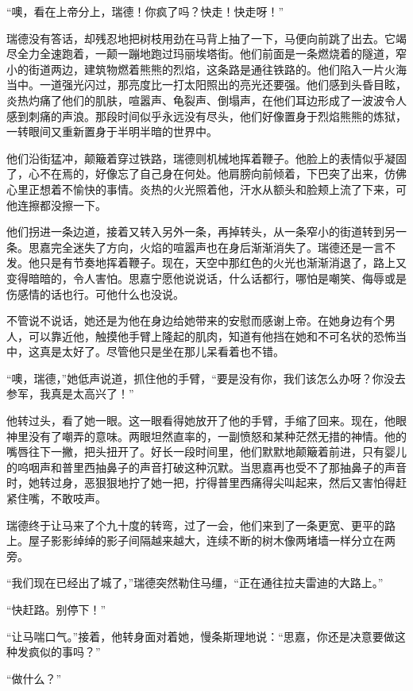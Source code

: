 \par “噢，看在上帝分上，瑞德！你疯了吗？快走！快走呀！”
\par 瑞德没有答话，却残忍地把树枝用劲在马背上抽了一下，马便向前跳了出去。它竭尽全力全速跑着，一颠一蹦地跑过玛丽埃塔街。他们前面是一条燃烧着的隧道，窄小的街道两边，建筑物燃着熊熊的烈焰，这条路是通往铁路的。他们陷入一片火海当中。一道强光闪过，那亮度比一打太阳照出的亮光还要强。他们感到头昏目眩，炎热灼痛了他们的肌肤，喧嚣声、龟裂声、倒塌声，在他们耳边形成了一波波令人感到刺痛的声浪。那段时间似乎永远没有尽头，他们好像置身于烈焰熊熊的炼狱，一转眼间又重新置身于半明半暗的世界中。
\par 他们沿街猛冲，颠簸着穿过铁路，瑞德则机械地挥着鞭子。他脸上的表情似乎凝固了，心不在焉的，好像忘了自己身在何处。他肩膀向前倾着，下巴突了出来，仿佛心里正想着不愉快的事情。炎热的火光照着他，汗水从额头和脸颊上流了下来，可他连擦都没擦一下。
\par 他们拐进一条边道，接着又转入另外一条，再掉转头，从一条窄小的街道转到另一条。思嘉完全迷失了方向，火焰的喧嚣声也在身后渐渐消失了。瑞德还是一言不发。他只是有节奏地挥着鞭子。现在，天空中那红色的火光也渐渐消退了，路上又变得暗暗的，令人害怕。思嘉宁愿他说说话，什么话都行，哪怕是嘲笑、侮辱或是伤感情的话也行。可他什么也没说。
\par 不管说不说话，她还是为他在身边给她带来的安慰而感谢上帝。在她身边有个男人，可以靠近他，触摸他手臂上隆起的肌肉，知道有他挡在她和不可名状的恐怖当中，这真是太好了。尽管他只是坐在那儿呆看着也不错。
\par “噢，瑞德，”她低声说道，抓住他的手臂，“要是没有你，我们该怎么办呀？你没去参军，我真是太高兴了！”
\par 他转过头，看了她一眼。这一眼看得她放开了他的手臂，手缩了回来。现在，他眼神里没有了嘲弄的意味。两眼坦然直率的，一副愤怒和某种茫然无措的神情。他的嘴唇往下一撇，把头扭开了。好长一段时间里，他们默默地颠簸着前进，只有婴儿的呜咽声和普里西抽鼻子的声音打破这种沉默。当思嘉再也受不了那抽鼻子的声音时，她转过身，恶狠狠地拧了她一把，拧得普里西痛得尖叫起来，然后又害怕得赶紧住嘴，不敢吱声。
\par 瑞德终于让马来了个九十度的转弯，过了一会，他们来到了一条更宽、更平的路上。屋子影影绰绰的影子间隔越来越大，连续不断的树木像两堵墙一样分立在两旁。
\par “我们现在已经出了城了，”瑞德突然勒住马缰，“正在通往拉夫雷迪的大路上。”
\par “快赶路。别停下！”
\par “让马喘口气。”接着，他转身面对着她，慢条斯理地说：“思嘉，你还是决意要做这种发疯似的事吗？”
\par “做什么？”
